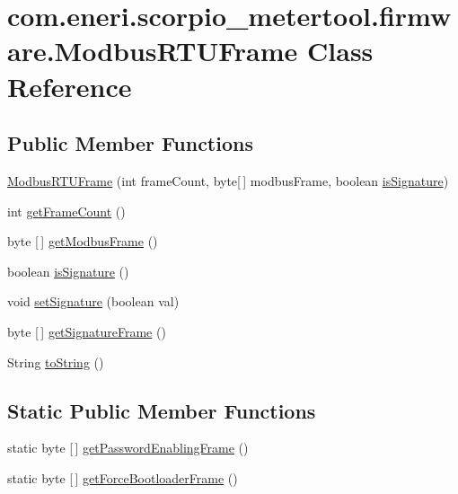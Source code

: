 \hypertarget{classcom_1_1eneri_1_1scorpio__metertool_1_1firmware_1_1_modbus_r_t_u_frame}{}\section{com.\+eneri.\+scorpio\+\_\+metertool.\+firmware.\+Modbus\+R\+T\+U\+Frame Class Reference}
\label{classcom_1_1eneri_1_1scorpio__metertool_1_1firmware_1_1_modbus_r_t_u_frame}
\subsection*{Public Member Functions}
\begin{DoxyCompactItemize}
\item 
\hyperlink{classcom_1_1eneri_1_1scorpio__metertool_1_1firmware_1_1_modbus_r_t_u_frame_aa487ca2a1aa937193bd2cbaaf337ffcb}{Modbus\+R\+T\+U\+Frame} (int frame\+Count, byte\mbox{[}$\,$\mbox{]} modbus\+Frame, boolean \hyperlink{classcom_1_1eneri_1_1scorpio__metertool_1_1firmware_1_1_modbus_r_t_u_frame_a50e460063d4899c12b564cc7ff651839}{is\+Signature})
\item 
int \hyperlink{classcom_1_1eneri_1_1scorpio__metertool_1_1firmware_1_1_modbus_r_t_u_frame_a54f4ca4a4ead83cb8e34ad1eb4947a59}{get\+Frame\+Count} ()
\item 
byte \mbox{[}$\,$\mbox{]} \hyperlink{classcom_1_1eneri_1_1scorpio__metertool_1_1firmware_1_1_modbus_r_t_u_frame_a13296803eedd2515c5ed65cca3c90ff4}{get\+Modbus\+Frame} ()
\item 
boolean \hyperlink{classcom_1_1eneri_1_1scorpio__metertool_1_1firmware_1_1_modbus_r_t_u_frame_a50e460063d4899c12b564cc7ff651839}{is\+Signature} ()
\item 
void \hyperlink{classcom_1_1eneri_1_1scorpio__metertool_1_1firmware_1_1_modbus_r_t_u_frame_a3a60bc3313af0155bc693413c1f96dba}{set\+Signature} (boolean val)
\item 
byte \mbox{[}$\,$\mbox{]} \hyperlink{classcom_1_1eneri_1_1scorpio__metertool_1_1firmware_1_1_modbus_r_t_u_frame_a10db6fb09b5602488c4db8bb8e2a679c}{get\+Signature\+Frame} ()
\item 
String \hyperlink{classcom_1_1eneri_1_1scorpio__metertool_1_1firmware_1_1_modbus_r_t_u_frame_a2a3663e6a78899f0500e16865a5cd50b}{to\+String} ()
\end{DoxyCompactItemize}
\subsection*{Static Public Member Functions}
\begin{DoxyCompactItemize}
\item 
static byte \mbox{[}$\,$\mbox{]} \hyperlink{classcom_1_1eneri_1_1scorpio__metertool_1_1firmware_1_1_modbus_r_t_u_frame_a3bf1ea1670b66f5ae180811b895bcd48}{get\+Password\+Enabling\+Frame} ()
\item 
static byte \mbox{[}$\,$\mbox{]} \hyperlink{classcom_1_1eneri_1_1scorpio__metertool_1_1firmware_1_1_modbus_r_t_u_frame_a3251dc0169b1cd43303845c90f82d35f}{get\+Force\+Bootloader\+Frame} ()
\end{DoxyCompactItemize}


